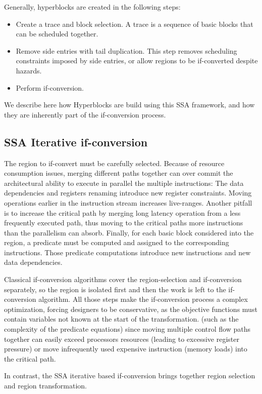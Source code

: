 Generally, hyperblocks are created in the following steps:
\begin{itemize}
\item Create a trace and block selection. A trace is a sequence of basic blocks that can be scheduled together. 
\item Remove side entries with tail duplication. This step removes scheduling constraints imposed by side entries, or allow regions to be if-converted despite hazards.
\item Perform if-conversion.
\end{itemize}

We describe here how Hyperblocks are build using this SSA framework, and how they are inherently part of the if-conversion process.

\subsection{SSA Iterative if-conversion}

The region to if-convert must be carefully selected. Because of resource consumption issues, merging different paths together can over commit the architectural ability to execute in parallel the multiple instructions: The data dependencies and registers renaming introduce new register constraints. Moving operations earlier in the instruction stream increases live-ranges. 
Another pitfall is to increase the critical path by merging long latency operation from a less frequently executed path, thus moving to the critical paths more instructions than the parallelism can absorb.
Finally, for each basic block considered into the region, a predicate must be computed and assigned to the corresponding instructions. Those predicate computations introduce new instructions and new data dependencies.

Classical if-conversion algorithms cover the region-selection and if-conversion separately, so the region is isolated first and then the work is left to the if-conversion algorithm. All those steps make the if-conversion process a complex optimization, forcing designers to be conservative, as the objective functions must contain variables not known at the start of the transformation. (such as the complexity of the predicate equations) since moving multiple control flow paths together can easily exceed processors resources (leading to excessive register pressure) or move infrequently used expensive instruction (memory loads) into the critical path. 

In contrast, the SSA iterative based if-conversion brings together region selection and region transformation.

